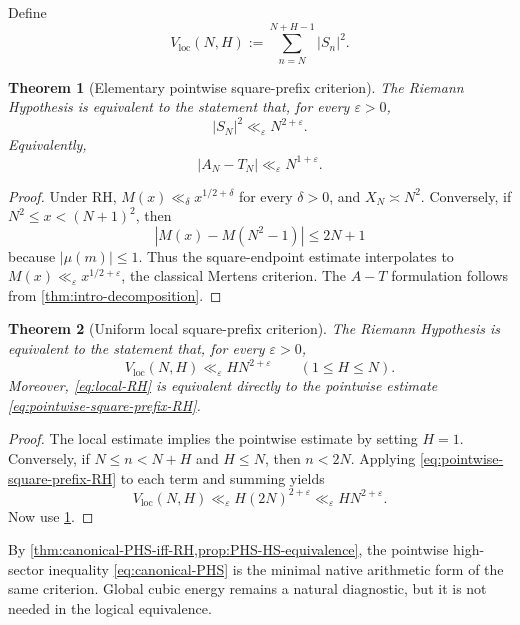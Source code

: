\documentclass[11pt]{article}
\newtheorem{theorem}{Theorem}[section]
\theoremstyle{definition}
\theoremstyle{remark}
\newcommand{\eps}{\varepsilon}
\newcommand{\1}{\mathbf{1}}
\begin{document}
Define
\begin{equation}
 V_{\mathrm{loc}}(N,H)
 :=\sum_{n=N}^{N+H-1}|S_n|^2.
 \label{eq:Vloc}
\end{equation}

\begin{theorem}[Elementary pointwise square-prefix criterion]
\label{thm:pointwise-square-prefix-RH}
The Riemann Hypothesis is equivalent to the statement that, for every $\eps>0$,
\begin{equation}
 \boxed{|S_N|^2\ll_\eps N^{2+\eps}.}
 \label{eq:pointwise-square-prefix-RH}
\end{equation}
Equivalently,
\begin{equation}
 |A_N-T_N|\ll_\eps N^{1+\eps}.
 \label{eq:pointwise-AT-RH-again}
\end{equation}
\end{theorem}

\begin{proof}
Under RH, $M(x)\ll_\delta x^{1/2+\delta}$ for every $\delta>0$, and $X_N\asymp N^2$.  Conversely, if $N^2\le x<(N+1)^2$, then
\[
 |M(x)-M(N^2-1)|\le2N+1
\]
because $|\mu(m)|\le1$.  Thus the square-endpoint estimate interpolates to $M(x)\ll_\eps x^{1/2+\eps}$, the classical Mertens criterion.  The $A-T$ formulation follows from \cref{thm:intro-decomposition}.
\end{proof}

\begin{theorem}[Uniform local square-prefix criterion]
\label{thm:local-RH}
The Riemann Hypothesis is equivalent to the statement that, for every $\eps>0$,
\begin{equation}
 V_{\mathrm{loc}}(N,H)
 \ll_\eps HN^{2+\eps}
 \qquad(1\le H\le N).
 \label{eq:local-RH}
\end{equation}
Moreover, \cref{eq:local-RH} is equivalent directly to the pointwise estimate \cref{eq:pointwise-square-prefix-RH}.
\end{theorem}

\begin{proof}
The local estimate implies the pointwise estimate by setting $H=1$.  Conversely, if $N\le n<N+H$ and $H\le N$, then $n<2N$.  Applying \cref{eq:pointwise-square-prefix-RH} to each term and summing yields
\[
 V_{\mathrm{loc}}(N,H)
 \ll_\eps H(2N)^{2+\eps}
 \ll_\eps HN^{2+\eps}.
\]
Now use \cref{thm:pointwise-square-prefix-RH}.
\end{proof}

By \cref{thm:canonical-PHS-iff-RH,prop:PHS-HS-equivalence}, the pointwise high-sector inequality \cref{eq:canonical-PHS} is the minimal native arithmetic form of the same criterion.  Global cubic energy remains a natural diagnostic, but it is not needed in the logical equivalence.
\end{document}
